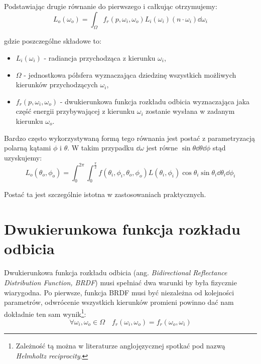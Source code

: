 \documentclass[../main.tex]{subfiles}
\begin{document}
Podstawiając drugie równanie do pierwszego i całkując otrzymujemy:
\[
  L_{o}(\omega_o) =
  \int_{\Omega} {
    f_r(p, \omega_i, \omega_o)
    L_i(\omega_i)
    (n \cdot \omega_i)
    \dd{\omega_i}
  }
\]

\noindent gdzie poszczególne składowe to:

\begin{itemize}

  \item $L_i(\omega_i)$ - radiancja przychodząca z kierunku $\omega_i$,

  \item $\Omega$ - jednostkowa półsfera wyznaczająca dziedzinę wszystkich
    możliwych kierunków przychodzących $\omega_i$,

  \item $f_{r}(p, \omega_i, \omega_o)$ - dwukierunkowa funkcja rozkładu odbicia wyznaczająca jaka część energii przybywającej z kierunku $\omega_i$ zostanie wysłana w zadanym kierunku $\omega_o$.

\end{itemize}

Bardzo często wykorzystywaną formą tego równania jest postać z parametryzacją polarną kątami $\phi$ i $\theta$. W takim przypadku $\dd \omega$ jest równe $\sin\theta \dd\theta \dd\phi$ \cite{wolfram_solidangle} stąd uzyskujemy:
\[
L_{o}(\theta_o, \phi_o) = \int_{0}^{2\pi} \int_{0}^{\frac{\pi}{2}} {
	f(\theta_i, \phi_i, \theta_o, \phi_o)L(\theta_i, \phi_i) \cos\theta_i \sin\theta_i
} \dd\theta_i \dd\phi_i
\]

\noindent Postać ta jest szczególnie istotna w zastosowaniach praktycznych.

\section{Dwukierunkowa funkcja rozkładu odbicia}

Dwukierunkowa funkcja rozkładu odbicia (ang. \textit{Bidirectional Reflectance Distribution Function, BRDF}) musi spełniać dwa warunki by była fizycznie wiarygodna. Po pierwsze, funkcja BRDF musi być niezależna od kolejności parametrów, odwrócenie wszystkich kierunków promieni powinno dać nam dokładnie ten sam wynik\footnote{Zależność tą można w literaturze anglojęzycznej spotkać pod nazwą \textit{Helmholtz reciprocity}.}:
\[
  \forall{\omega_i, \omega_o \in \Omega} \quad
  f_r(\omega_i, \omega_o) = f_r(\omega_o, \omega_i)
\]
\end{document}
